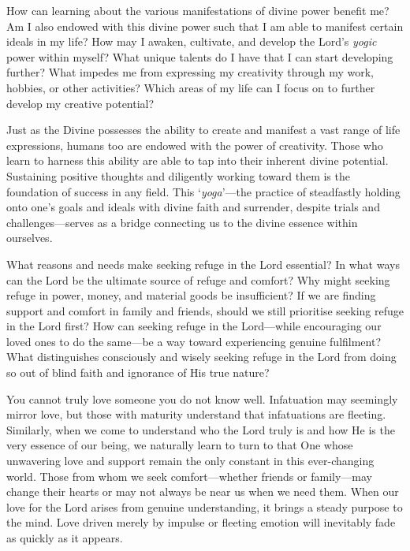 \newpage
\begin{mananam}{}
\normalfont\mananamtext How can learning about the various manifestations of divine power benefit me? Am I also endowed with this divine power such that I am able to manifest certain ideals in my life? How may I awaken, cultivate, and develop the Lord’s \emph{yogic} power within myself?
What unique talents do I have that I can start developing further? What impedes me from expressing my creativity through my work, hobbies, or other activities? Which areas of my life can I focus on to further develop my creative potential?
\end{mananam}
\sreflect
\begin{inspiration}{}
\normalfont\mananamtext Just as the Divine possesses the ability to create and manifest a vast range of life expressions, humans too are endowed with the power of creativity. Those who learn to harness this ability are able to tap into their inherent divine potential. Sustaining positive thoughts and diligently working toward them is the foundation of success in any field. This ‘\emph{yoga}’—the practice of steadfastly holding onto one’s goals and ideals with divine faith and surrender, despite trials and challenges—serves as a bridge connecting us to the divine essence within ourselves.
\end{inspiration}
\newpage
\begin{mananam}{}
\normalfont\mananamtext What reasons and needs make seeking refuge in the Lord essential? In what ways can the Lord be the ultimate source of refuge and comfort?
Why might seeking refuge in power, money, and material goods be insufficient?
If we are finding support and comfort in family and friends, should we still prioritise seeking refuge in the Lord first? How can seeking refuge in the Lord—while encouraging our loved ones to do the same—be a way toward experiencing genuine fulfilment?
What distinguishes consciously and wisely seeking refuge in the Lord from doing so out of blind faith and ignorance of His true nature?
\end{mananam}
\sreflect
\begin{inspiration}{}
\normalfont\mananamtext You cannot truly love someone you do not know well. Infatuation may seemingly mirror love, but those with maturity understand that infatuations are fleeting. Similarly, when we come to understand who the Lord truly is and how He is the very essence of our being, we naturally learn to turn to that One whose unwavering love and support remain the only constant in this ever-changing world. Those from whom we seek comfort—whether friends or family—may change their hearts or may not always be near us when we need them.
When our love for the Lord arises from genuine understanding, it brings a steady purpose to the mind. Love driven merely by impulse or fleeting emotion will inevitably fade as quickly as it appears.
\end{inspiration}
\newpage

